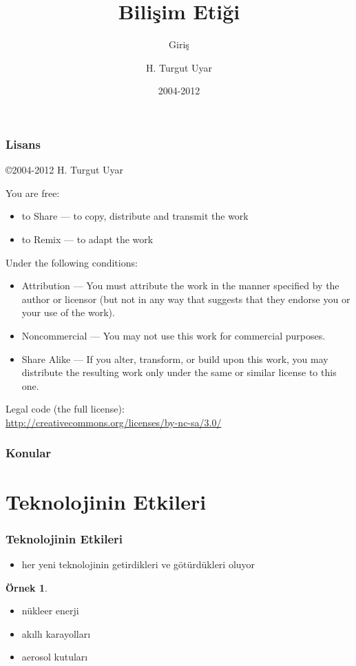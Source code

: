 \documentclass[dvipsnames]{beamer}
\title{Bilişim Etiği}
\subtitle{Giriş}
\author{H. Turgut Uyar}
\date{2004-2012}
\theoremstyle{definition}
\theoremstyle{example}
\newtheorem{ornek}[theorem]{Örnek}
\theoremstyle{plain}
\begin{document}
\begin{frame}
  \titlepage
\end{frame}

\begin{frame}
  \frametitle{Lisans}

  \hfill
  \copyright 2004-2012 H. Turgut Uyar

  \vfill
  \begin{tiny}
    You are free:
    \begin{itemize}
      \item to Share — to copy, distribute and transmit the work
      \item to Remix — to adapt the work
    \end{itemize}

    Under the following conditions:
    \begin{itemize}
      \item Attribution — You must attribute the work in the manner specified by
        the author or licensor (but not in any way that suggests that they
        endorse you or your use of the work).

      \item Noncommercial — You may not use this work for commercial purposes.

      \item Share Alike — If you alter, transform, or build upon this work, you
        may distribute the resulting work only under the same or similar license
        to this one.
    \end{itemize}
  \end{tiny}

  \vfill
  Legal code (the full license):\\
  \url{http://creativecommons.org/licenses/by-nc-sa/3.0/}
\end{frame}

\begin{frame}
  \frametitle{Konular}
  \tableofcontents
\end{frame}

\section{Teknolojinin Etkileri}

\begin{frame}
  \frametitle{Teknolojinin Etkileri}

  \begin{itemize}
    \item her yeni teknolojinin getirdikleri ve götürdükleri oluyor
  \end{itemize}

  \begin{ornek}
    \begin{itemize}
      \item nükleer enerji
      \item akıllı karayolları
      \item aerosol kutuları
    \end{itemize}
  \end{ornek}
\end{frame}
\end{document}
